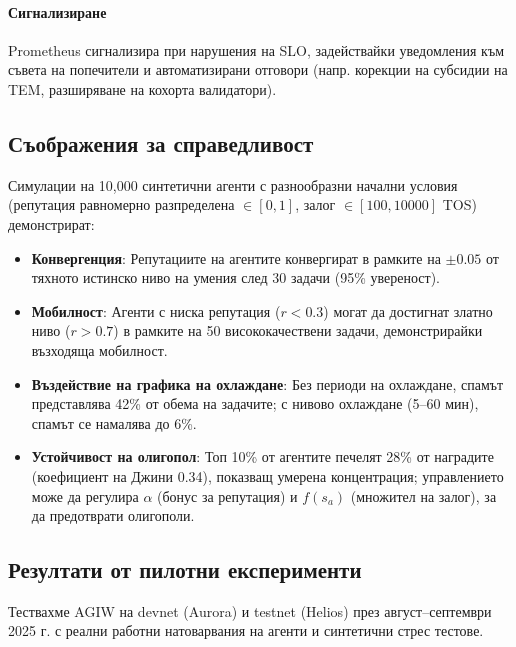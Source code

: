 \documentclass[11pt]{article}
\begin{document}
\paragraph{Сигнализиране} Prometheus сигнализира при нарушения на SLO, задействайки уведомления към съвета на попечители и автоматизирани отговори (напр. корекции на субсидии на TEM, разширяване на кохорта валидатори).

\subsection{Съображения за справедливост}
Симулации на 10,000 синтетични агенти с разнообразни начални условия (репутация равномерно разпределена $\in [0,1]$, залог $\in [100, 10000]$ TOS) демонстрират:
\begin{itemize}[noitemsep]
  \item \textbf{Конвергенция}: Репутациите на агентите конвергират в рамките на $\pm0.05$ от тяхното истинско ниво на умения след 30 задачи (95\% увереност).
  \item \textbf{Мобилност}: Агенти с ниска репутация ($r<0.3$) могат да достигнат златно ниво ($r>0.7$) в рамките на 50 висококачествени задачи, демонстрирайки възходяща мобилност.
  \item \textbf{Въздействие на графика на охлаждане}: Без периоди на охлаждане, спамът представлява 42\% от обема на задачите; с нивово охлаждане (5--60 мин), спамът се намалява до 6\%.
  \item \textbf{Устойчивост на олигопол}: Топ 10\% от агентите печелят 28\% от наградите (коефициент на Джини 0.34), показващ умерена концентрация; управлението може да регулира $\alpha$ (бонус за репутация) и $f(s_a)$ (множител на залог), за да предотврати олигополи.
\end{itemize}

\subsection{Резултати от пилотни експерименти}
\label{sec:pilot-results}
Тествахме AGIW на devnet (Aurora) и testnet (Helios) през август--септември 2025 г. с реални работни натоварвания на агенти и синтетични стрес тестове.
\end{document}
